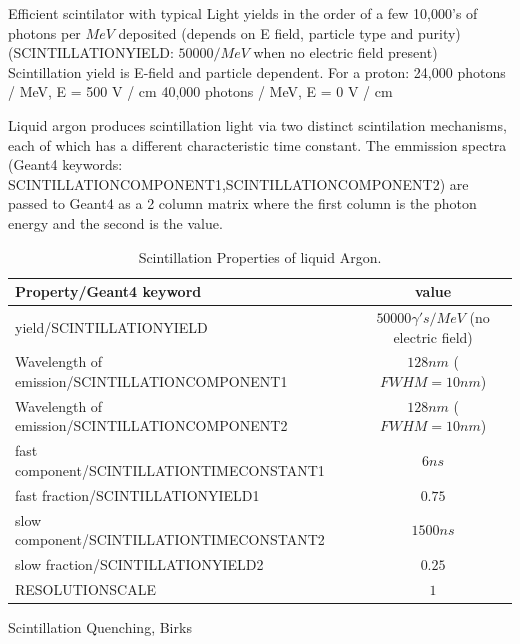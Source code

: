 \documentclass[a4paper]{jpconf}
\begin{document}
  Efficient scintilator with typical Light yields in the order of a few 10,000’s of photons per $MeV$  deposited (depends on E field, particle type and purity)
  (SCINTILLATIONYIELD: $50000/MeV$ when no electric field present)
Scintillation yield is E-field and particle
dependent. For a proton:
24,000 photons / MeV, E = 500 V / cm
40,000 photons / MeV, E = 0 V / cm
  
  Liquid argon produces scintillation light via two distinct scintilation mechanisms, each
  of which has a different characteristic time constant. The emmission spectra (Geant4 keywords: SCINTILLATIONCOMPONENT1,SCINTILLATIONCOMPONENT2) are passed to Geant4
  as a 2 column matrix where the first column is the photon energy and the second is the value.

  \begin{table}[h!]
  \begin{center}
    \label{tab:table1}
    \begin{tabular}{|l|c|} %
      \hline
      \textbf{Property/Geant4 keyword} &       \textbf{value}\\
      \hline
      yield/SCINTILLATIONYIELD & $50000 \gamma 's/MeV$ (no electric field)\\
      Wavelength of emission/SCINTILLATIONCOMPONENT1 &  $128nm$ ($FWHM=10nm$)\\
      Wavelength of emission/SCINTILLATIONCOMPONENT2 &  $128nm$ ($FWHM=10nm$)\\
      fast component/SCINTILLATIONTIMECONSTANT1& $6 ns$\\  
      fast fraction/SCINTILLATIONYIELD1& $0.75$ \\
      slow component/SCINTILLATIONTIMECONSTANT2& $1500 ns$ \\
      slow fraction/SCINTILLATIONYIELD2& $0.25$\\
      RESOLUTIONSCALE& $1$\\
      \hline
    \end{tabular}
  \end{center}
  \caption{Scintillation Properties of liquid Argon.}
  \end{table}

  Scintillation Quenching,  Birks
  
\end{document}
